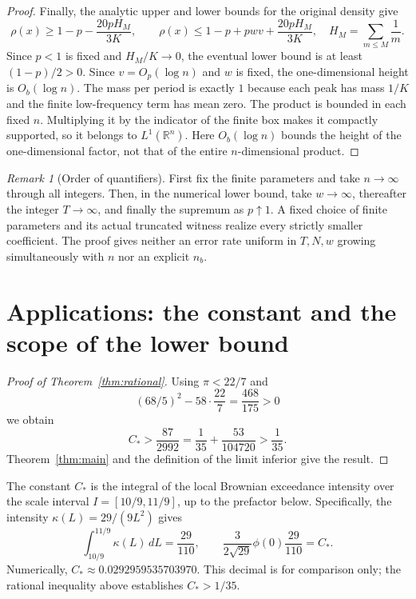 \documentclass[a4paper,11pt]{article}
\theoremstyle{remark}
\newtheorem{remark}[lemma]{Remark}
\begin{document}
\begin{proof}
Finally, the analytic upper and lower bounds for the original density give
\[
 \rho(x)\ge1-p-\frac{20pH_M}{3K},\qquad
 \rho(x)\le1-p+pwv+\frac{20pH_M}{3K},
 \quad H_M=\sum_{m\le M}\frac1m.
\]
Since $p<1$ is fixed and $H_M/K\to0$, the eventual lower bound is at least $(1-p)/2>0$.
Since $v=O_p(\log n)$ and $w$ is fixed, the one-dimensional height is $O_b(\log n)$.
The mass per period is exactly $1$ because each peak has mass $1/K$ and the finite low-frequency term has mean zero.
The product is bounded in each fixed $n$. Multiplying it by the indicator of the finite box makes it compactly supported, so it belongs to
$L^1(\mathbb R^n)$. Here $O_b(\log n)$ bounds the height of the one-dimensional factor, not that of the entire
$n$-dimensional product.
\end{proof}

\begin{remark}[Order of quantifiers]
First fix the finite parameters and take $n\to\infty$ through all integers. Then, in the numerical lower bound,
take $w\to\infty$, thereafter the integer $T\to\infty$, and finally the supremum as $p\uparrow1$.
A fixed choice of finite parameters and its actual truncated witness realize every strictly smaller coefficient.
The proof gives neither an error rate uniform in $T,N,w$ growing simultaneously with $n$ nor an explicit $n_b$.
\end{remark}

\section{Applications: the constant and the scope of the lower bound}\label{sec:discussion}
\begin{proof}[Proof of Theorem~\ref{thm:rational}]
Using $\pi<22/7$ and
\[
 (68/5)^2-58\cdot\frac{22}{7}=\frac{468}{175}>0
\]
we obtain
\[
 C_*>\frac{87}{2992}=\frac1{35}+\frac{53}{104720}>\frac1{35}.
\]
Theorem~\ref{thm:main} and the definition of the limit inferior give the result.
\end{proof}

The constant $C_*$ is the integral of the local Brownian exceedance intensity over the scale interval $I=[10/9,11/9]$, up to the prefactor below.
Specifically, the intensity $\kappa(L)=29/(9L^2)$ gives
\[
 \int_{10/9}^{11/9}\kappa(L)\,dL=\frac{29}{110},\qquad
 \frac{3}{2\sqrt{29}}\phi(0)\frac{29}{110}=C_*.
\]
Numerically, $C_*\approx0.0292959535703970$. This decimal is for comparison only;
the rational inequality above establishes $C_*>1/35$.
\end{document}
